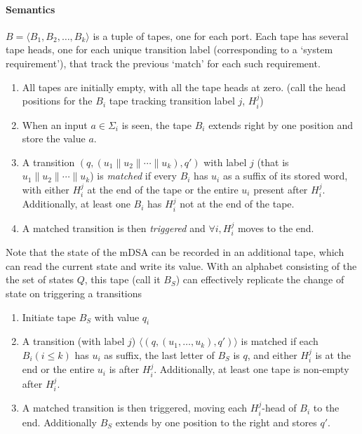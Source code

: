 \paragraph*{Semantics} $B=\langle B_1,B_2,\dots,B_{k} \rangle$ is a tuple of tapes, one for each port. Each tape has several tape heads, one for each unique transition label (corresponding to a `system requirement'), that track the previous `match' for each such requirement. 

\begin{enumerate}
\item All tapes are initially empty, with all the tape heads at zero. (call the head positions for the $B_i$ tape tracking transition label $j$, $H_{i}^{j}$)

\item When an input $a \in \Sigma_i$ is seen, the tape $B_i$ extends right by one position and store the value $a$.

\item A transition $(q, (u_1 \parallel u_2 \parallel \cdots \parallel u_k), q')$ with label $j$ (that is $u_1 \parallel u_2 \parallel \cdots \parallel u_k$) is \emph{matched} if every $B_i$ has $u_i$ as a suffix of its stored word, with either $H_{i}^{j}$ at the end of the tape or the entire $u_i$ present after $H_{i}^{j}$. Additionally, at least one $B_i$ has $H_{i}^{j}$ not at the end of the tape.

\item A matched transition is then \emph{triggered} and $\forall i, H_{i}^{j}$ moves to the end. 
\end{enumerate}

Note that the state of the mDSA can be recorded in an additional tape, which can read the current state and write its value. With an alphabet consisting of the the set of states $Q$, this tape (call it $B_S$) can effectively replicate the change of state on triggering a transitions

\begin{enumerate}
\item Initiate tape $B_S$ with value $q_i$

\item A transition (with label $j$) $\langle (q, (u_1, \dots, u_k), q') \rangle$ is matched if each $B_i (i\le k)$ has $u_i$ as suffix, the last letter of $B_{S}$ is $q$, and either $H_{i}^{j}$ is at the end or the entire $u_i$ is after $H_{i}^{j}$. Additionally, at least one tape is non-empty after $H_{i}^{j}$.

\item A matched transition is then triggered, moving each $H_{i}^{j}$-head of $B_i$ to the end. Additionally $B_{S}$ extends by one position to the right and stores $q'$.
\end{enumerate}


